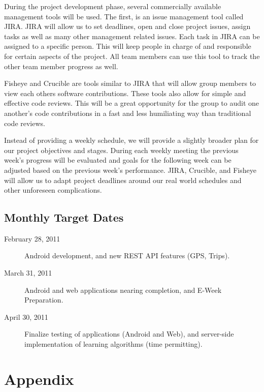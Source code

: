 \documentclass[12pt]{article}
\begin{document}
During the project development phase, several commercially available management tools will be used.  The first, is an issue management tool called JIRA.  JIRA will allow us to set deadlines, open and close project issues, assign tasks as well as many other management related issues.  Each task in JIRA can be assigned to a specific person.  This will keep people in charge of and responsible for certain aspects of the project.  All team members can use this tool to track the other team member progress as well.

Fisheye and Crucible are tools similar to JIRA that will allow group members to view each others software contributions.  These tools also allow for simple and effective code reviews.  This will be a great opportunity for the group to audit one another's code contributions in a fast and less humiliating way than traditional code reviews.

Instead of providing a weekly schedule, we will provide a slightly broader plan for our project objectives and stages.  During each weekly meeting the previous week's progress will be evaluated and goals for the following week can be adjusted based on the previous week’s performance.  JIRA, Crucible, and Fisheye will allow us to adapt project deadlines around our real world schedules and other unforeseen complications.

\subsection{Monthly Target Dates}\label{subsec:MonthlyTargetDates}

\begin{description}
	\item[February 28, 2011] Android development, and new REST API features (GPS, Trips).
	\item[March 31, 2011] Android and web applications nearing completion, and E-Week Preparation.
	\item[April 30, 2011] Finalize testing of applications (Android and Web), and server-side implementation of learning algorithms (time permitting).
\end{description}

%
%
\newpage
\section{Appendix}\label{sec:Appendix}
\appendix
\end{document}
